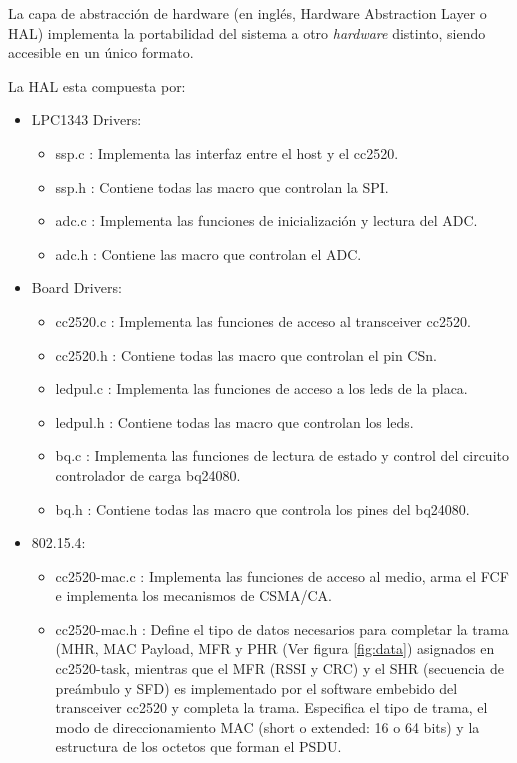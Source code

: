 {La capa de abstracción de hardware (en inglés, Hardware Abstraction Layer o HAL) implementa la portabilidad del sistema a otro \textit{hardware} distinto, siendo accesible en un único formato.

\noindent La HAL esta compuesta por:
\begin{itemize}
\item LPC1343 Drivers:
\begin{itemize}
	\item ssp.c : Implementa las interfaz entre el host y el cc2520.
	\item ssp.h : Contiene todas las macro que controlan la SPI.
	\item adc.c : Implementa las funciones de inicialización y lectura del ADC.
	\item adc.h : Contiene las macro que controlan el ADC.
	\end{itemize}
\item Board Drivers:
	\begin{itemize}
	\item cc2520.c : Implementa las funciones de acceso al transceiver cc2520.
	\item cc2520.h : Contiene todas las macro que controlan el pin CSn.
	\item ledpul.c : Implementa las funciones de acceso a los leds de la placa.
	\item ledpul.h : Contiene todas las macro que controlan los leds.
	\item bq.c : Implementa las funciones de lectura de estado y control del circuito controlador de carga bq24080.
	\item bq.h : Contiene todas las macro que controla los pines del bq24080.
	\end{itemize}
\item 802.15.4:
	\begin{itemize}
	\item cc2520-mac.c : Implementa las funciones de acceso al medio, arma el FCF e implementa los mecanismos de CSMA/CA.
	\item cc2520-mac.h : Define el tipo de datos necesarios para completar la trama (MHR, MAC Payload, MFR y PHR (Ver figura \ref{fig:data}) asignados en cc2520-task, mientras que el MFR (RSSI y CRC) y el SHR (secuencia de preámbulo y SFD) es implementado por el software embebido del transceiver cc2520 y completa la trama. Especifica el tipo de trama, el modo de direccionamiento MAC (short o extended: 16 o 64 bits) y la estructura de los octetos que forman el PSDU.
	\end{itemize}
\end{itemize}

}

